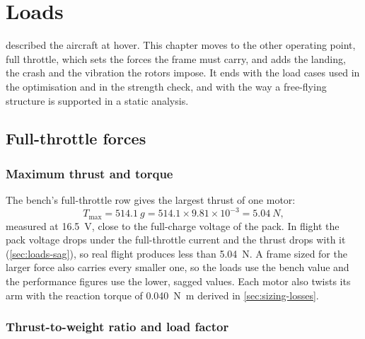 \chapter{Loads}\label{sec:loads}

 described the aircraft at hover. This chapter moves to the other operating point, full throttle, which sets the forces the frame must carry, and adds the landing, the crash and the vibration the rotors impose. It ends with the load cases used in the optimisation and in the strength check, and with the way a free-flying structure is supported in a static analysis.

\section{Full-throttle forces}\label{sec:loads-thrust}

\subsection{Maximum thrust and torque}

The bench's full-throttle row gives the largest thrust of one motor:
\begin{equation}
T_\text{max} = \SI{514.1}{g} = 514.1 \times 9.81\times10^{-3} = \SI{5.04}{N},
\end{equation}
measured at \SI{16.5}{V}, close to the full-charge voltage of the pack. In flight the pack voltage drops under the full-throttle current and the thrust drops with it (\cref{sec:loads-sag}), so real flight produces less than \SI{5.04}{N}. A frame sized for the larger force also carries every smaller one, so the loads use the bench value and the performance figures use the lower, sagged values. Each motor also twists its arm with the reaction torque of \SI{0.040}{N.m} derived in \cref{sec:sizing-losses}.

\subsection{Thrust-to-weight ratio and load factor}

